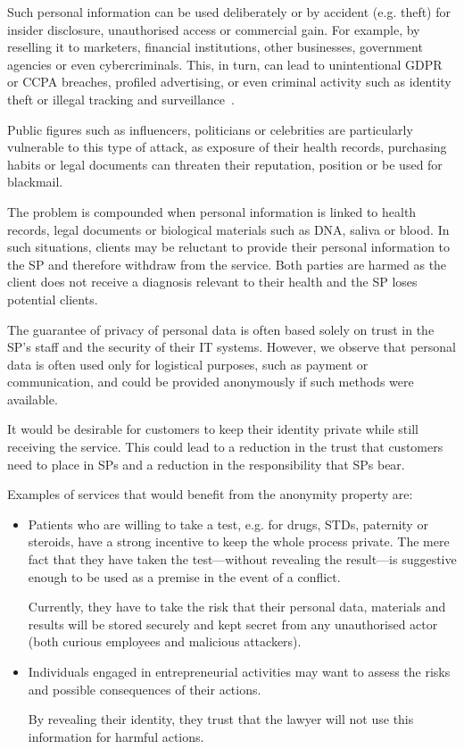 \documentclass[pdftex,twocolumn,epjc3]{svjour3}
\begin{document}
Such personal information can be used deliberately or by accident (e.g. theft) for insider disclosure, unauthorised access or commercial gain. For example, by reselling it to marketers, financial institutions, other businesses, government agencies or even cybercriminals. 
This, in turn, can lead to unintentional GDPR or CCPA breaches, profiled advertising, or even criminal activity such as identity theft or illegal tracking and surveillance~\cite{smithInformationPrivacyResearch2011}.

Public figures such as influencers, politicians or celebrities are particularly vulnerable to this type of attack, as exposure of their health records, purchasing habits or legal documents can threaten their reputation, position or be used for blackmail.

The problem is compounded when personal information is linked to health records, legal documents or biological materials such as DNA, saliva or blood.
In such situations, clients may be reluctant to provide their personal information to the SP and therefore withdraw from the service. Both parties are harmed as the client does not receive a diagnosis relevant to their health and the SP loses potential clients.

The guarantee of privacy of personal data is often based solely on trust in the SP's staff and the security of their IT systems. However, we observe that personal data is often used only for logistical purposes, such as payment or communication, and could be provided anonymously if such methods were available.

It would be desirable for customers to keep their identity private while still receiving the service. This could lead to a reduction in the trust that customers need to place in SPs and a reduction in the responsibility that SPs bear.

Examples of services that would benefit from the anonymity property are:
\begin{itemize}
    \item Patients who are willing to take a test, e.g. for drugs, STDs, paternity or steroids, have a strong incentive to keep the whole process private. The mere fact that they have taken the test—without revealing the result—is suggestive enough to be used as a premise in the event of a conflict.

    Currently, they have to take the risk that their personal data, materials and results will be stored securely and kept secret from any unauthorised actor (both curious employees and malicious attackers).


\item Individuals engaged in entrepreneurial activities may want to assess the risks and possible consequences of their actions.

By revealing their identity, they trust that the lawyer will not use this information for harmful actions.
\end{itemize}
\end{document}
